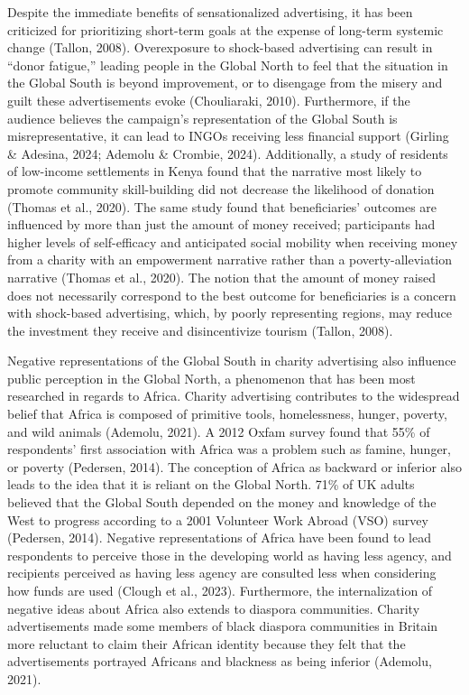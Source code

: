 Despite the immediate benefits of sensationalized advertising, it has been criticized for prioritizing short-term goals at the expense of long-term systemic change (Tallon, 2008). Overexposure to shock-based advertising can result in “donor fatigue,” leading people in the Global North to feel that the situation in the Global South is beyond improvement, or to disengage from the misery and guilt these advertisements evoke (Chouliaraki, 2010). Furthermore, if the audience believes the campaign's representation of the Global South is misrepresentative, it can lead to INGOs receiving less financial support (Girling \& Adesina, 2024; Ademolu \& Crombie, 2024). Additionally, a study of residents of low-income settlements in Kenya found that the narrative most likely to promote community skill-building did not decrease the likelihood of donation (Thomas et al., 2020). The same study found that beneficiaries' outcomes are influenced by more than just the amount of money received; participants had higher levels of self-efficacy and anticipated social mobility when receiving money from a charity with an empowerment narrative rather than a poverty-alleviation narrative (Thomas et al., 2020). The notion that the amount of money raised does not necessarily correspond to the best outcome for beneficiaries is a concern with shock-based advertising, which, by poorly representing regions, may reduce the investment they receive and disincentivize tourism (Tallon, 2008).

Negative representations of the Global South in charity advertising also influence public perception in the Global North, a phenomenon that has been most researched in regards to Africa. Charity advertising contributes to the widespread belief that Africa is composed of primitive tools, homelessness, hunger, poverty, and wild animals (Ademolu, 2021). A 2012 Oxfam survey found that 55\% of respondents' first association with Africa was a problem such as famine, hunger, or poverty (Pedersen, 2014). The conception of Africa as backward or inferior also leads to the idea that it is reliant on the Global North. 71\% of UK adults believed that the Global South depended on the money and knowledge of the West to progress according to a 2001 Volunteer Work Abroad (VSO) survey (Pedersen, 2014). Negative representations of Africa have been found to lead respondents to perceive those in the developing world as having less agency, and recipients perceived as having less agency are consulted less when considering how funds are used (Clough et al., 2023). Furthermore, the internalization of negative ideas about Africa also extends to diaspora communities. Charity advertisements made some members of black diaspora communities in Britain more reluctant to claim their African identity because they felt that the advertisements portrayed Africans and blackness as being inferior (Ademolu, 2021). 

